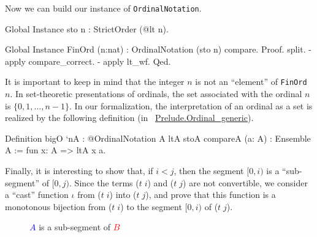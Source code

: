 Now we can build our instance of \texttt{OrdinalNotation}.

\begin{Coqsrc}
Global Instance sto n : StrictOrder (@lt n).

Global Instance FinOrd (n:nat) : OrdinalNotation (sto n) compare.
Proof.
  split.
  - apply compare_correct.
  - apply lt_wf.
Qed.
\end{Coqsrc}

\begin{remark}
It is important to keep in mind  that the integer $n$ is not an ``element'' of \texttt{FinOrd $n$}. In set-theoretic presentations of ordinals, the set associated with the ordinal $n$ is $\{0,1,\dots,n-1\}$. 
In our formalization, the interpretation of an ordinal as a set is realized by the following definition
(in ~\href{../src/html/hydras.Prelude.Ordinal_generic.html}{Prelude.Ordinal\_generic}).

\begin{Coqsrc}
Definition bigO `{nA : @OrdinalNotation A ltA stoA compareA}
           (a: A) : Ensemble A :=
  fun x: A => ltA x a.
\end{Coqsrc}
\end{remark}



Finally, it is interesting to show that, if $i<j$, then the segment $[0,i)$ is a ``sub-segment'' of
$[0,j)$. Since the terms  ($t\;i$) and ($t\;j$) are not convertible, we consider a ``cast'' 
function $\iota$ from ($t\;i$) into ($t\;j$), and prove that this function is  a monotonous bijection  from ($t\;i$) to
the segment $[0,i)$ of ($t\;j$).




 \begin{figure}[h]
   \centering
   \caption{\textcolor{blue}{$A$} is a sub-segment  of \textcolor{red}{$B$}}
   \label{fig:subsegment}
 \end{figure}




